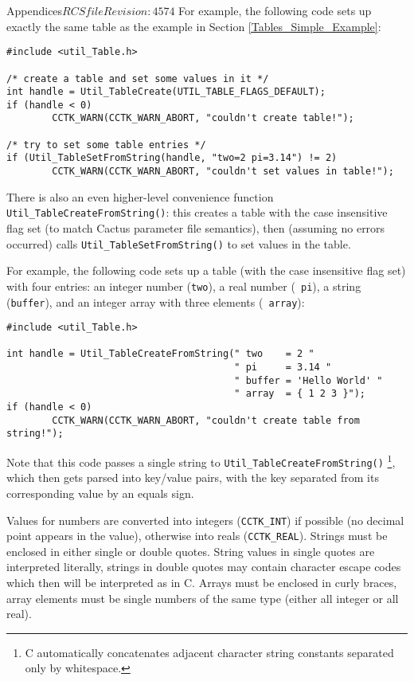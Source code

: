 \begin{cactuspart}{Appendices}{$RCSfile$}{$Revision: 4574 $}
For example, the following code sets up exactly the same table as the
example in Section \ref{Tables_Simple_Example}:

\begin{verbatim}
#include <util_Table.h>

/* create a table and set some values in it */
int handle = Util_TableCreate(UTIL_TABLE_FLAGS_DEFAULT);
if (handle < 0)
        CCTK_WARN(CCTK_WARN_ABORT, "couldn't create table!");

/* try to set some table entries */
if (Util_TableSetFromString(handle, "two=2 pi=3.14") != 2)
        CCTK_WARN(CCTK_WARN_ABORT, "couldn't set values in table!");
\end{verbatim}

There is also an even higher-level convenience function
\verb|Util_TableCreateFromString()|: this creates a table with the
case insensitive flag set (to match Cactus parameter file semantics),
then (assuming no errors occurred) calls \verb|Util_TableSetFromString()|
to set values in the table.

For example, the following code sets up a table (with the case insensitive flag
set) with four entries: an integer number ({\tt two}), a real number ({\tt
pi}), a string ({\tt buffer}), and an integer array with three elements ({\tt
array}):

\begin{verbatim}
#include <util_Table.h>

int handle = Util_TableCreateFromString(" two    = 2 "
                                        " pi     = 3.14 "
                                        " buffer = 'Hello World' "
                                        " array  = { 1 2 3 }");
if (handle < 0)
        CCTK_WARN(CCTK_WARN_ABORT, "couldn't create table from string!");
\end{verbatim}

Note that this code passes a single string to
\verb|Util_TableCreateFromString()|%
\footnote{C automatically concatenates
adjacent character string constants separated only by whitespace.}, 
which then gets parsed into key/value pairs, with the key separated from its
corresponding value by an equals sign.

Values for numbers are converted into integers ({\tt CCTK\_INT}) if possible
(no decimal point appears in the value), otherwise into reals ({\tt CCTK\_REAL}).
Strings must be enclosed in either single or double quotes. String values in
single quotes are interpreted literally, strings in double quotes may contain
character escape codes which then will be interpreted as in C.
Arrays must be enclosed in curly braces, array elements must be single numbers
of the same type (either all integer or all real).


\end{cactuspart}
